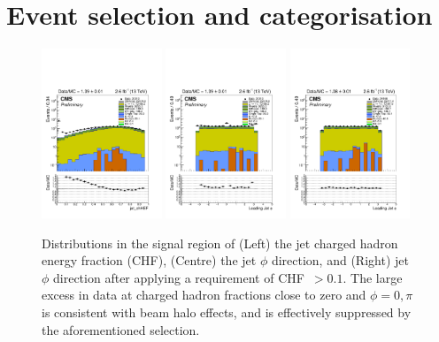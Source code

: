 \section{Event selection and categorisation}
\label{app:selection}

\begin{figure}[h!]
    \begin{center}
        {\includegraphics[width=0.32\textwidth]{figures/selection/jet_chHEF_mono_all_before.pdf}}
        {\includegraphics[width=0.32\textwidth]{figures/selection/jet_phi[0]_mono_all_before.pdf}}
        {\includegraphics[width=0.32\textwidth]{figures/selection/jet_phi[0]_mono_all_after.pdf}}
        \caption{Distributions in the signal region of (Left) the jet
          charged hadron energy fraction (CHF), (Centre) the jet
          $\phi$ direction, and (Right) jet $\phi$ direction after
          applying a requirement of {CHF~$>0.1$}. The large excess in
          data at charged hadron fractions close to zero and ${\phi =
            0, \pi}$ is consistent with beam halo effects, and is
          effectively suppressed by the aforementioned selection.}
        \label{fig:leadJetCleaning}
    \end{center}
\end{figure}

